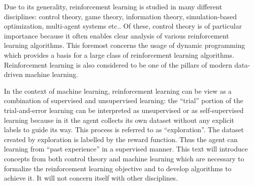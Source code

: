  

Due to its generality, reinforcement learning is studied in many different disciplines: 
control theory, game theory,
information theory, simulation-based optimization, multi-agent systems etc..
Of these, control theory is of particular importance because it
often enables clear analysis of various reinforcement learning algorithms.
This foremost concerns the usage of dynamic programming which
provides a basis for a large class of reinforcement learning algorithms.
Reinforcement learning is also considered to be one of the pillars of modern data-driven machine learning.


In the context of machine learning, reinforcement learning can be view as a combination 
of supervised and unsupervised learning:
the ``trial'' portion of the trial-and-error learning can be interpreted as unsupervised or as self-supervised learning
because in it the agent collects its own dataset without any explicit labels to guide its way.
This process is referred to as ``exploration''.
The dataset created by exploration is labelled by the reward function.
Thus the agent can learning from ``past experience'' in a supervised manner.
This text will introduce concepts from both control theory
and machine learning which are necessary to formalize the reinforcement learning objective
and to develop algorithms to achieve it.
It will not concern itself with other disciplines.

